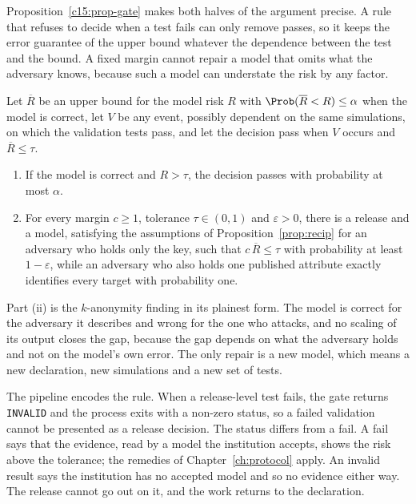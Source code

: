 Proposition~\ref{c15:prop-gate} makes both halves of the argument precise. A rule
that refuses to decide when a test fails can only remove passes, so it keeps the
error guarantee of the upper bound whatever the dependence between the test and the
bound. A fixed margin cannot repair a model that omits what the adversary knows,
because such a model can understate the risk by any factor.

\begin{proposition}\label{c15:prop-gate}
Let $\overline{R}$ be an upper bound for the model risk $R$ with
$\Prob(\overline{R} < R) \le \alpha$ when the model is correct, let $V$ be any event,
possibly dependent on the same simulations, on which the validation tests pass, and
let the decision pass when $V$ occurs and $\overline{R} \le \tau$.
\begin{enumerate}
\item[(i)] If the model is correct and $R > \tau$, the decision passes with
probability at most $\alpha$.
\item[(ii)] For every margin $c \ge 1$, tolerance $\tau \in (0,1)$ and
$\varepsilon > 0$, there is a release and a model, satisfying the assumptions of
Proposition~\ref{prop:recip} for an adversary who holds only the key, such that
$c\,\overline{R} \le \tau$ with probability at least $1 - \varepsilon$, while an
adversary who also holds one published attribute exactly identifies every target
with probability one.
\end{enumerate}
\end{proposition}

Part (ii) is the $k$-anonymity finding in its plainest form. The model is correct
for the adversary it describes and wrong for the one who attacks, and no scaling of
its output closes the gap, because the gap depends on what the adversary holds and
not on the model's own error. The only repair is a new model, which means a new
declaration, new simulations and a new set of tests.

The pipeline encodes the rule. When a release-level test fails, the gate returns
\texttt{INVALID} and the process exits with a non-zero status, so a failed
validation cannot be presented as a release decision.
The status differs from a fail. A fail says that the evidence, read by a model the
institution accepts, shows the risk above the tolerance; the remedies of
Chapter~\ref{ch:protocol} apply. An invalid result says the institution has no
accepted model and so no evidence either way. The release cannot go out on it, and
the work returns to the declaration.

